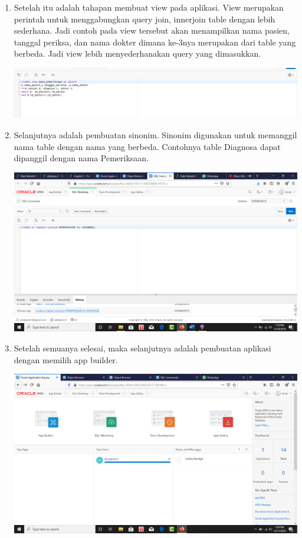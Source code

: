 \begin{enumerate}
    \item Setelah itu adalah tahapan membuat view pada aplikasi. View merupakan perintah untuk menggabungkan query join, innerjoin table dengan lebih sederhana. Jadi contoh pada view tersebut akan menampilkan nama pasien, tanggal periksa, dan nama dokter dimana ke-3nya merupakan dari  table yang berbeda. Jadi view lebih menyederhanakan query yang dimasukkan.
    \begin{center}
    \includegraphics[width=10cm\textwidth]{gambar/16.png}
    \end{center}
    \item Selanjutnya adalah pembuatan sinonim. Sinonim  digunakan untuk memanggil nama table dengan nama yang berbeda. Contohnya table Diagnosa dapat dipanggil dengan nama Pemeriksaan.
    \begin{center}
    \includegraphics[width=10cm\textwidth]{gambar/17.png}
    \end{center}
    \item Setelah  semuanya selesai, maka selanjutnya adalah pembuatan aplikasi dengan memilih  app builder.
    \begin{center}
    \includegraphics[width=10cm\textwidth]{gambar/18.png}
    \end{center}

\end{enumerate}
